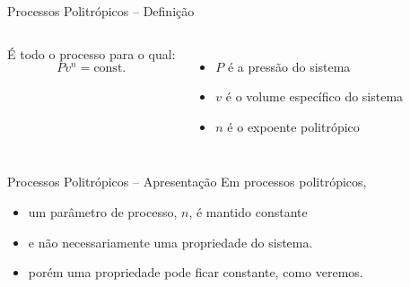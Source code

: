     \begin{frame}{Processos Politrópicos -- Definição}\vspace*{-2em}
        \begin{columns}
        É todo o processo para o qual:
        \alert{$$Pv^n = \mbox{const.}$$}%
         \\[\bigskipamount]
        \begin{itemize}
            \item<2-> $P$ é a pressão do sistema \\[\bigskipamount]
            \item<3-> $v$ é o volume específico do sistema \\[\bigskipamount]
            \item<4-> $n$ é o \alert{expoente politrópico}
        \end{itemize}
        \end{columns}
    \end{frame}

    \begin{frame}{Processos Politrópicos -- Apresentação}\vspace*{-2em}
        Em processos politrópicos, \\[\medskipamount]
        \begin{itemize}
            \item<1-> um \alert{parâmetro} de processo, \alert{$n$}, é mantido constante
                \\[\medskipamount]
            \item<2-> e não \alert{necessariamente} uma \alert{propriedade} do sistema.
                \\[\medskipamount]
            \item<3-> porém uma propriedade \alert{pode} ficar constante, como veremos.
                \\[\bigskipamount]
        \end{itemize}
    \end{frame}

